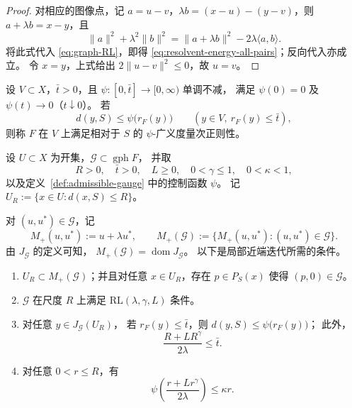 \begin{proof}
对相应的图像点，记
$a=u-v$，$\lambda b=(x-u)-(y-v)$，则
$a+\lambda b=x-y$，且
\[
 \|a\|^2+\lambda^2\|b\|^2
 =\|a+\lambda b\|^2-2\lambda\langle a,b\rangle.
\]
将此式代入 \eqref{eq:graph-RL}，即得
\eqref{eq:resolvent-energy-all-pairs}；反向代入亦成立。
令 $x=y$，上式给出 $2\|u-v\|^2\leq0$，故 $u=v$。
\end{proof}

\begin{definition}[广义度量次正则性]
\label{def:admissible-gauge}
设 $V\subset X$，$\bar t>0$，且
$\psi:[0,\bar t]\to[0,\infty)$ 单调不减，
满足 $\psi(0)=0$ 及 $\psi(t)\to0$（$t\downarrow0$）。
若
\begin{equation}
\label{eq:gauge-EB}
 d(y,S)\leq\psi\bigl(r_F(y)\bigr)
 \qquad (y\in V,\ r_F(y)\leq\bar t),
\end{equation}
则称 $F$ 在 $V$ 上满足相对于 $S$ 的
$\psi$-广义度量次正则性。
\end{definition}

\begin{assumption}[局部 RLEB 假设]
\label{ass:local-rleb}
设 $U\subset X$ 为开集，$\mathcal G\subset\operatorname{gph}F$，
并取
\[
R>0,\quad \bar t>0,\quad L\geq0,\quad
0<\gamma\leq1,\quad 0<\kappa<1,
\]
以及定义~\ref{def:admissible-gauge} 中的控制函数 $\psi$。
记 $U_R:=\{x\in U:d(x,S)\leq R\}$。
\end{assumption}
对 $(u,u^*)\in\mathcal G$，记
\[
 M_+(u,u^*):=u+\lambda u^*,
 \qquad
 M_+(\mathcal G)
 :=\{M_+(u,u^*):(u,u^*)\in\mathcal G\}.
\]
由 $J_{\mathcal G}$ 的定义可知，
$M_+(\mathcal G)=\operatorname{dom}J_{\mathcal G}$。
以下是局部近端迭代所需的条件。

\begin{enumerate}
\item[(A1)] 
$U_R\subset M_+(\mathcal G)$；并且对任意
$x\in U_R$，存在 $p\in P_S(x)$ 使得
$(p,0)\in\mathcal G$。

\item[(A2)] 
$\mathcal G$ 在尺度 $R$ 上满足
$\mathrm{RL}(\lambda,\gamma,L)$ 条件。

\item[(A3)] 
对任意 $y\in J_{\mathcal G}(U_R)$，
若 $r_F(y)\leq\bar t$，则
$d(y,S)\leq\psi\bigl(r_F(y)\bigr)$；
此外，
\begin{equation}
\label{eq:gauge-domain}
 \frac{R+LR^\gamma}{2\lambda}\leq\bar t.
\end{equation}

\item[(A4)] 
对任意 $0<r\leq R$，有
\begin{equation}
\label{eq:direct-compatibility}
 \psi\!\left(\frac{r+Lr^\gamma}{2\lambda}\right)
 \leq\kappa r.
\end{equation}
\end{enumerate}

